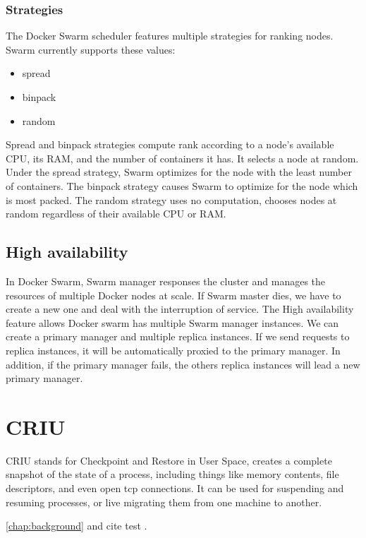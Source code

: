\subsubsection{Strategies}
The Docker Swarm scheduler features multiple strategies for ranking nodes. Swarm currently supports these values:
\begin{itemize}
    \item spread
    \item binpack
    \item random
\end{itemize}
Spread and binpack strategies compute rank according to a node’s available CPU, its RAM, and the number of containers it has. It selects a node at random. Under the spread strategy, Swarm optimizes for the node with the least number of containers. The binpack strategy causes Swarm to optimize for the node which is most packed. The random strategy uses no computation, chooses nodes at random regardless of their available CPU or RAM.
\subsection{High availability}
In Docker Swarm, Swarm manager responses the cluster and manages the resources of multiple Docker nodes at scale. If Swarm master dies, we have to create a new one and deal with the interruption of service.
The High availability feature allows Docker swarm has multiple Swarm manager instances. We can create a primary manager and multiple replica instances. If we send requests to replica instances, it will be automatically proxied to the primary manager. In addition, if the primary manager fails, the others replica instances will lead a new primary manager.
\section{CRIU}
CRIU stands for Checkpoint and Restore in User Space, creates a complete snapshot of the state of a process, including things like memory contents, file descriptors, and even open tcp connections. It can be used for suspending and resuming processes, or live migrating them from one machine to another.

\ref{chap:background} and cite test \cite{Knight:1986:AMF:319838.319854, Sohi:1995:MP:225830.224451, Hammond:1998:DSS:291069.291020}.